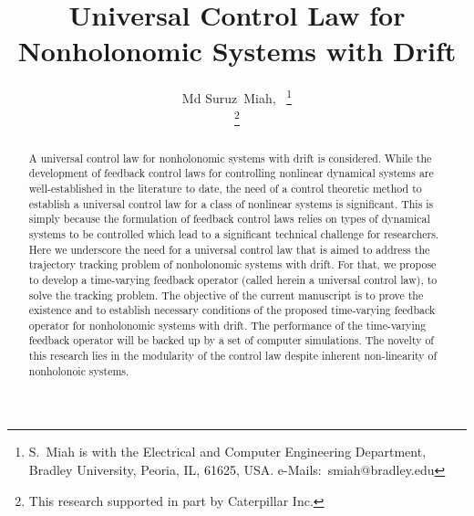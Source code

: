 \documentclass[
12pt,draftcls,onecolumn%
]{IEEEtran}
\begin{document}
%
\title{Universal Control Law for Nonholonomic Systems with Drift}

\author{Md Suruz~Miah,~%
\thanks{S.~Miah is with the Electrical and Computer Engineering Department, Bradley University, Peoria, IL, 61625, USA. e-Mails:~smiah@bradley.edu}%



\thanks{This research supported in part by Caterpillar Inc.}
}

\maketitle

\begin{abstract}
A universal control law for nonholonomic systems with drift is considered. While the development of feedback control laws for controlling nonlinear dynamical systems are well-established in the literature to date, the need of a control theoretic method to establish a universal control law for a class of nonlinear systems is significant. 
This is simply because the formulation of feedback control laws  relies on types of dynamical systems to be controlled which lead to a significant technical challenge for researchers.%
%
Here we underscore the need for a universal control law  that is aimed to address the trajectory tracking problem of nonholonomic systems with drift. For that, we propose to develop a time-varying feedback operator (called  herein a universal control law), to solve the tracking problem. The objective of the current manuscript is to prove the existence and to establish necessary conditions of the proposed time-varying feedback operator for nonholonomic systems with drift. The performance of the time-varying feedback operator will be backed up by a set of computer simulations. The novelty of this research lies in the modularity of the control law despite inherent non-linearity of nonholonoic systems. 
%

\end{abstract}
\end{document}
